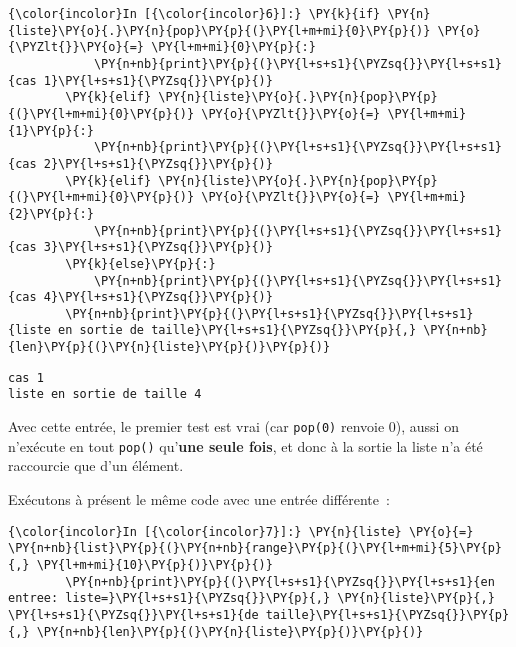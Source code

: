     \begin{Verbatim}[commandchars=\\\{\},frame=single,framerule=0.3mm,rulecolor=\color{cellframecolor}]
{\color{incolor}In [{\color{incolor}6}]:} \PY{k}{if} \PY{n}{liste}\PY{o}{.}\PY{n}{pop}\PY{p}{(}\PY{l+m+mi}{0}\PY{p}{)} \PY{o}{\PYZlt{}}\PY{o}{=} \PY{l+m+mi}{0}\PY{p}{:}
            \PY{n+nb}{print}\PY{p}{(}\PY{l+s+s1}{\PYZsq{}}\PY{l+s+s1}{cas 1}\PY{l+s+s1}{\PYZsq{}}\PY{p}{)}
        \PY{k}{elif} \PY{n}{liste}\PY{o}{.}\PY{n}{pop}\PY{p}{(}\PY{l+m+mi}{0}\PY{p}{)} \PY{o}{\PYZlt{}}\PY{o}{=} \PY{l+m+mi}{1}\PY{p}{:}
            \PY{n+nb}{print}\PY{p}{(}\PY{l+s+s1}{\PYZsq{}}\PY{l+s+s1}{cas 2}\PY{l+s+s1}{\PYZsq{}}\PY{p}{)}
        \PY{k}{elif} \PY{n}{liste}\PY{o}{.}\PY{n}{pop}\PY{p}{(}\PY{l+m+mi}{0}\PY{p}{)} \PY{o}{\PYZlt{}}\PY{o}{=} \PY{l+m+mi}{2}\PY{p}{:}
            \PY{n+nb}{print}\PY{p}{(}\PY{l+s+s1}{\PYZsq{}}\PY{l+s+s1}{cas 3}\PY{l+s+s1}{\PYZsq{}}\PY{p}{)}
        \PY{k}{else}\PY{p}{:}
            \PY{n+nb}{print}\PY{p}{(}\PY{l+s+s1}{\PYZsq{}}\PY{l+s+s1}{cas 4}\PY{l+s+s1}{\PYZsq{}}\PY{p}{)}
        \PY{n+nb}{print}\PY{p}{(}\PY{l+s+s1}{\PYZsq{}}\PY{l+s+s1}{liste en sortie de taille}\PY{l+s+s1}{\PYZsq{}}\PY{p}{,} \PY{n+nb}{len}\PY{p}{(}\PY{n}{liste}\PY{p}{)}\PY{p}{)}
\end{Verbatim}


    \begin{Verbatim}[commandchars=\\\{\},frame=single,framerule=0.3mm,rulecolor=\color{cellframecolor}]
cas 1
liste en sortie de taille 4
\end{Verbatim}

    Avec cette entrée, le premier test est vrai (car \texttt{pop(0)} renvoie
0), aussi on n'exécute en tout \texttt{pop()} qu'\textbf{une seule
fois}, et donc à la sortie la liste n'a été raccourcie que d'un élément.

    Exécutons à présent le même code avec une entrée différente~:

    \begin{Verbatim}[commandchars=\\\{\},frame=single,framerule=0.3mm,rulecolor=\color{cellframecolor}]
{\color{incolor}In [{\color{incolor}7}]:} \PY{n}{liste} \PY{o}{=} \PY{n+nb}{list}\PY{p}{(}\PY{n+nb}{range}\PY{p}{(}\PY{l+m+mi}{5}\PY{p}{,} \PY{l+m+mi}{10}\PY{p}{)}\PY{p}{)}
        \PY{n+nb}{print}\PY{p}{(}\PY{l+s+s1}{\PYZsq{}}\PY{l+s+s1}{en entree: liste=}\PY{l+s+s1}{\PYZsq{}}\PY{p}{,} \PY{n}{liste}\PY{p}{,} \PY{l+s+s1}{\PYZsq{}}\PY{l+s+s1}{de taille}\PY{l+s+s1}{\PYZsq{}}\PY{p}{,} \PY{n+nb}{len}\PY{p}{(}\PY{n}{liste}\PY{p}{)}\PY{p}{)}
\end{Verbatim}



